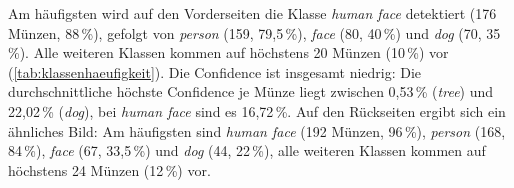 Am häufigsten wird auf den Vorderseiten die Klasse \textit{human face} detektiert (176 Münzen, 88\,\%), gefolgt von \textit{person} (159, 79,5\,\%), \textit{face} (80, 40\,\%) und \textit{dog} (70, 35\,\%). Alle weiteren Klassen kommen auf höchstens 20 Münzen (10\,\%) vor (\cref{tab:klassenhaeufigkeit}). Die Confidence ist insgesamt niedrig: Die durchschnittliche höchste Confidence je Münze liegt zwischen 0,53\,\% (\textit{tree}) und 22,02\,\% (\textit{dog}), bei \textit{human face} sind es 16,72\,\%.  Auf den Rückseiten ergibt sich ein ähnliches Bild: Am häufigsten sind \textit{human face} (192 Münzen, 96\,\%), \textit{person} (168, 84\,\%), \textit{face} (67, 33,5\,\%) und \textit{dog} (44, 22\,\%), alle weiteren Klassen kommen auf höchstens 24 Münzen (12\,\%) vor.



